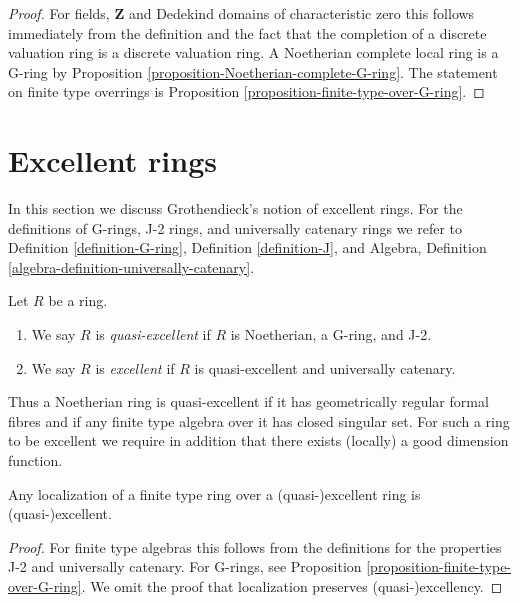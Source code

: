 \begin{proof}
For fields, $\mathbf{Z}$ and Dedekind domains of characteristic zero
this follows immediately from the definition and the fact that the
completion of a discrete valuation ring is a discrete valuation ring.
A Noetherian complete local ring is a G-ring by
Proposition \ref{proposition-Noetherian-complete-G-ring}.
The statement on finite type overrings is
Proposition \ref{proposition-finite-type-over-G-ring}.
\end{proof}






\section{Excellent rings}
\label{section-excellent}

\noindent
In this section we discuss Grothendieck's notion of excellent rings.
For the definitions of G-rings, J-2 rings, and universally catenary rings
we refer to Definition \ref{definition-G-ring},
Definition \ref{definition-J}, and
Algebra, Definition \ref{algebra-definition-universally-catenary}.

\begin{definition}
\label{definition-excellent}
Let $R$ be a ring.
\begin{enumerate}
\item We say $R$ is {\it quasi-excellent} if $R$ is Noetherian,
a G-ring, and J-2.
\item We say $R$ is {\it excellent} if $R$ is quasi-excellent
and universally catenary.
\end{enumerate}
\end{definition}

\noindent
Thus a Noetherian ring is quasi-excellent if it has geometrically regular
formal fibres and if any finite type algebra over it has closed singular
set. For such a ring to be excellent we require in addition that there
exists (locally) a good dimension function.

\begin{lemma}
\label{lemma-finite-type-over-excellent}
Any localization of a finite type ring over a (quasi-)excellent ring
is (quasi-)excellent.
\end{lemma}

\begin{proof}
For finite type algebras this follows from the definitions for
the properties J-2 and universally catenary. For G-rings, see
Proposition \ref{proposition-finite-type-over-G-ring}. We omit
the proof that localization preserves (quasi-)excellency.
\end{proof}

